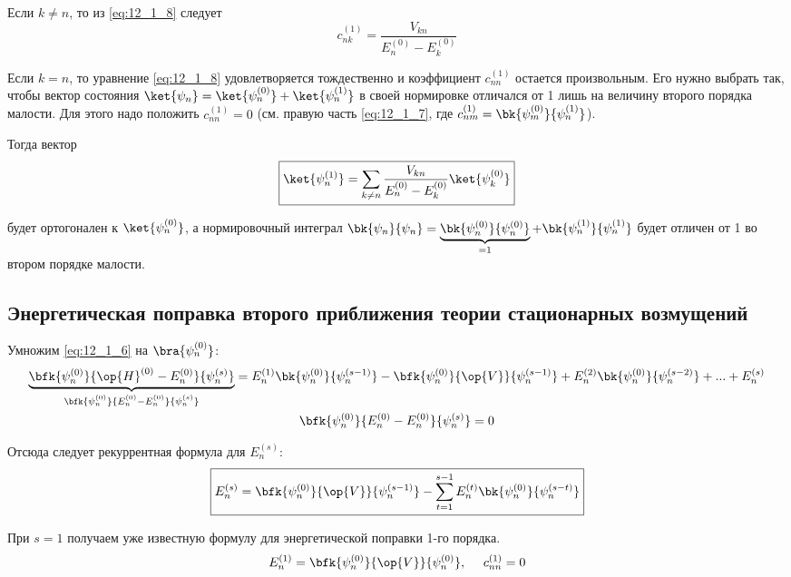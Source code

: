 Если $k \neq n$, то из \eqref{eq:12_1_8} следует
\begin{equation}
\label{eq:12_1_9}
c_{nk}^{(1)} = \frac{V_{kn}}{E_n^{(0)} - E_k^{(0)}}
\end{equation}

Если $k = n$, то уравнение \eqref{eq:12_1_8} удовлетворяется тождественно и коэффициент $c_{nn}^{(1)}$ остается произвольным. Его нужно выбрать так, чтобы вектор состояния $\ket{\psi_n} = \ket{\psi_n^{(0)}} + \ket{\psi_n^{(1)}}$ в своей нормировке отличался от 1 лишь на величину второго порядка малости. Для этого надо положить $c_{nn}^{(1)} = 0$ (см. правую часть \eqref{eq:12_1_7}, где $c_{nm}^{(1)} = \bk{\psi_m^{(0)}}{\psi_n^{(1)}}$).

Тогда вектор
\begin{equation}
\label{eq:12_1_10}
\boxed{\ket{\psi_n^{(1)}}= \sum_{k \neq n} \frac{V_{kn}}{E_n^{(0)} - E_k^{(0)}} \ket{\psi_k^{(0)}}}
\end{equation}

будет ортогонален к $\ket{\psi_n^{(0)}}$, а нормировочный интеграл $\bk{\psi_n}{\psi_n} = \underbrace{\bk{\psi_n^{(0)}}{\psi_n^{(0)}}}_{=1} + \bk{\psi_n^{(1)}}{\psi_n^{(1)}}$ будет отличен от 1 во втором порядке малости.

\subsection{Энергетическая поправка второго приближения теории стационарных возмущений}

Умножим \eqref{eq:12_1_6} на $\bra{\psi_n^{(0)}}$:
\begin{gather*}
\underbrace{\bfk{\psi_n^{(0)}}{\op{H}^{(0)} - E_n^{(0)}} {\psi_n^{(s)}}}_{\bfk{\psi_n^{(0)}}{E_n^{(0)} - E_n^{(0)}}{\psi_n^{(s)}}} = E_n^{(1)} \bk{\psi_n^{(0)}}{\psi_n^{(s-1)}} - \bfk{\psi_n^{(0)}}{\op{V}}{\psi_n^{(s-1)}} + E_n^{(2)}\bk{\psi_n^{(0)}}{\psi_n^{(s-2)}}+...+E_n^{(s)}\\
\bfk{\psi_n^{(0)}}{E_n^{(0)} - E_n^{(0)}}{\psi_n^{(s)}} = 0
\end{gather*}

Отсюда следует рекуррентная формула для $E_n^{(s)}$:
$$
\boxed{E_n^{(s)} = \bfk{\psi_n^{(0)}}{\op{V}}{\psi_n^{(s-1)}} - \sum_{t=1}^{s-1} E_n^{(t)} \bk{\psi_n^{(0)}}{\psi_n^{(s-t)}}}
$$

При $s=1$ получаем уже известную формулу для энергетической поправки 1-го порядка.
$$
E_n^{(1)} = \bfk{\psi_n^{(0)}}{\op{V}}{\psi_n^{(0)}}, ~~~~c_{nn}^{(1)} = 0
$$

